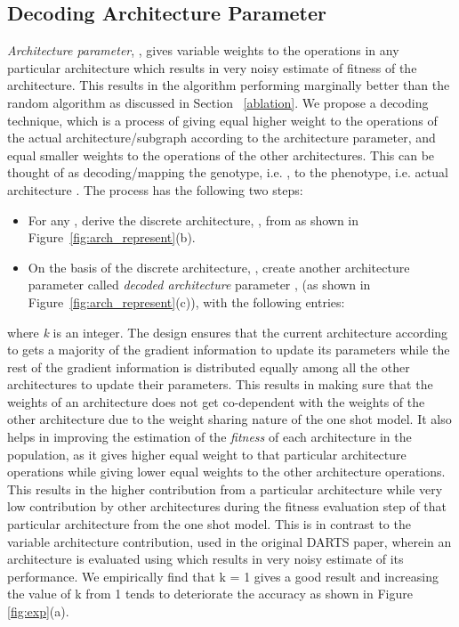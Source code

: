 \documentclass[final]{cvpr}
\begin{document}
\subsection{Decoding Architecture Parameter}\label{subsec:decode}
\textit{Architecture parameter}, , gives variable weights to the operations in any
particular architecture which results in very noisy estimate of fitness of the architecture. This
results in the algorithm performing marginally better than the random algorithm as discussed in
Section ~\ref{ablation}. We propose a decoding technique, which is a process of giving equal higher
weight to the operations of the actual architecture/subgraph according to the architecture
parameter,  and equal smaller weights to the operations of the other architectures. This
can be thought of as decoding/mapping the genotype, i.e. , to the phenotype, i.e. actual
architecture \cite{eiben2003introduction}. The process has the following two steps:
\begin{itemize}
    \item For any , derive the discrete architecture, , from 
     as shown in Figure~\ref{fig:arch_represent}(b).
    \item On the basis of the discrete architecture, , create 
    another architecture parameter called \textit{decoded architecture} parameter
    ,  (as shown in Figure~\ref{fig:arch_represent}(c)), with the following entries:
        
\end{itemize}
where \textit{k} is an integer. The design ensures that the current architecture according to
 gets a majority of the gradient information to update its parameters while the rest of
the gradient information is distributed equally among all the other architectures to update their
parameters. This results in making sure that the weights of an architecture does not get
co-dependent with the weights of the other architecture due to the weight sharing nature of the
one shot model. It also helps in improving the estimation of the \textit{fitness} of each
architecture in the population, as it gives higher equal weight to that particular architecture
operations while giving lower equal weights to the other architecture operations. This results in
the higher contribution from a particular architecture while very low contribution by other
architectures during the fitness evaluation step of that particular architecture from the one shot
model. This is in contrast to the variable architecture contribution, used in the original DARTS
paper, wherein an architecture is evaluated using  which results in very noisy estimate of
its performance. We empirically find that k = 1 gives a good result and increasing the value of k
from 1 tends to deteriorate the accuracy as shown in Figure \ref{fig:exp}(a).
\end{document}
